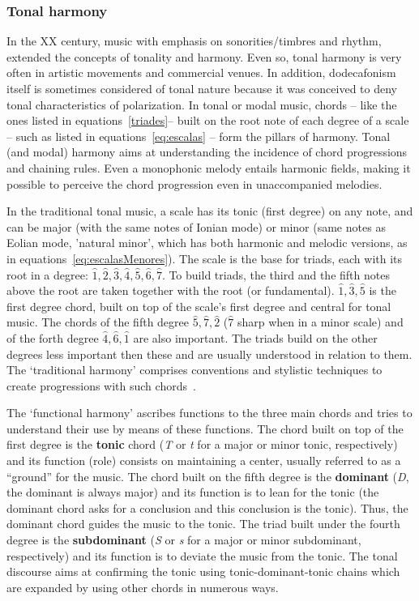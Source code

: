 \subsubsection{Tonal harmony}
In the XX century, music with emphasis on sonorities/timbres and rhythm, extended the concepts of tonality and harmony. Even so, tonal harmony is very often in artistic movements and commercial venues. In addition, dodecafonism itself is sometimes considered of tonal nature because it was conceived to deny tonal characteristics of polarization.
In tonal or modal music, chords -- like the ones listed in
equations~\ref{triades}-- built on the root note of each degree of a scale  -- such as listed in equations~\ref{eq:escalas} --  form the pillars of harmony. Tonal (and modal) harmony aims at understanding the incidence of chord progressions and chaining rules.
Even a monophonic melody entails harmonic fields, making it possible to perceive the chord progression even in unaccompanied melodies.

In the traditional tonal music, a scale has its tonic (first
degree) on any note, and can be major (with the same notes of Ionian mode) or minor (same notes as Eolian mode, 'natural minor', which has both harmonic and melodic versions, as in equations~\ref{eq:escalasMenores}). The
scale is the base for triads, each with its root in a degree: $\hat{1},\hat{2},\hat{3},\hat{4},\hat{5},\hat{6},\hat{7}$.
To build triads, the third and the fifth notes above the root are taken together with the root (or fundamental).
$\hat{1},\hat{3},\hat{5}$ is the first degree chord,
 built on top of the scale's first degree and central for tonal music. The chords of the fifth degree $\hat{5},\hat{7},\hat{2}$ ($\hat{7}$ sharp when in a minor scale) and of the forth degree $\hat{4},\hat{6},\hat{1}$ are also important. The triads build on the other degrees less important then these and are usually understood in relation to them. The `traditional harmony' comprises conventions and stylistic techniques to create progressions with such chords~\cite{Harmonia}. 

The `functional harmony' ascribes functions to the three main chords and tries to understand their use by means of these functions. The chord built on top of the first degree is the \textbf{tonic} chord (\textit{T} or \textit{t} for a major or minor tonic, respectively) and its function (role) consists on maintaining a center, usually referred to as a ``ground'' for the music. The chord built on the fifth degree is the \textbf{dominant} (\textit{D}, the dominant is always major) and its function is to lean for the tonic
(the dominant chord asks for a conclusion and this conclusion is the tonic). Thus, the dominant chord guides the music to the tonic. The triad built under the fourth degree is the \textbf{subdominant} (\textit{S} or \textit{s} for a major or minor
subdominant, respectively) and its function is to deviate the music from the tonic. The tonal discourse aims at confirming the tonic using tonic-dominant-tonic chains which are expanded by using other chords in numerous ways.

